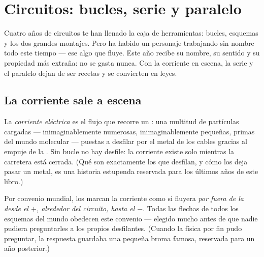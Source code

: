 \chapter{Circuitos: bucles, serie y paralelo}\label{ch:g7:circuits-series-parallel}

Cuatro años de circuitos te han llenado la caja de herramientas:
bucles, esquemas y los dos grandes montajes. Pero ha habido un
personaje trabajando sin nombre todo este tiempo --- ese algo que
fluye. Este año recibe su nombre, su sentido y su propiedad más
extraña: no se gasta nunca. Con la corriente en escena, la serie y el
paralelo dejan de ser recetas y se convierten en leyes.

\section{La corriente sale a escena}

\begin{definition}\label{def:g7:circuits-series-parallel:current}
La \emph{corriente eléctrica} es el flujo
que recorre un : una multitud de partículas
cargadas --- inimaginablemente numerosas, inimaginablemente pequeñas,
primas del mundo molecular --- puestas a desfilar por el metal de los
cables gracias al empuje de la . Sin bucle no hay desfile: la
corriente existe solo mientras la carretera está cerrada. (Qué son
exactamente los que desfilan, y cómo los deja pasar un metal, es una
historia estupenda reservada para los últimos años de este libro.)
\end{definition}

\begin{proposition}\label{prop:g7:circuits-series-parallel:direction}
Por convenio mundial, los  marcan la corriente
como si fluyera \emph{por fuera de la  desde el  $+$,
alrededor del circuito, hasta el  $-$}. Todas las flechas de
todos los esquemas del mundo obedecen este convenio --- elegido mucho
antes de que nadie pudiera preguntarles a los propios desfilantes.
(Cuando la física por fin pudo preguntar, la respuesta guardaba una
pequeña broma famosa, reservada para un año posterior.)
\end{proposition}

